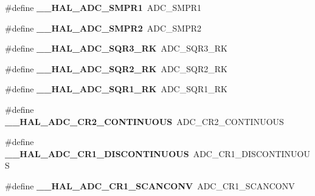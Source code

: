 \begin{DoxyCompactItemize}
\#define {\bfseries \+\_\+\+\_\+\+H\+A\+L\+\_\+\+A\+D\+C\+\_\+\+S\+M\+P\+R1}~A\+D\+C\+\_\+\+S\+M\+P\+R1
\item 
\mbox{\label{group___h_a_l___a_d_c___aliased___macros_gabd50880ede02b19440d1dbc549b19e8f}} 
\#define {\bfseries \+\_\+\+\_\+\+H\+A\+L\+\_\+\+A\+D\+C\+\_\+\+S\+M\+P\+R2}~A\+D\+C\+\_\+\+S\+M\+P\+R2
\item 
\mbox{\label{group___h_a_l___a_d_c___aliased___macros_ga999c539ac6b3b5ab766461e70dadf0a2}} 
\#define {\bfseries \+\_\+\+\_\+\+H\+A\+L\+\_\+\+A\+D\+C\+\_\+\+S\+Q\+R3\+\_\+\+RK}~A\+D\+C\+\_\+\+S\+Q\+R3\+\_\+\+RK
\item 
\mbox{\label{group___h_a_l___a_d_c___aliased___macros_ga6821ae59c39afefd2644d278974b2ab6}} 
\#define {\bfseries \+\_\+\+\_\+\+H\+A\+L\+\_\+\+A\+D\+C\+\_\+\+S\+Q\+R2\+\_\+\+RK}~A\+D\+C\+\_\+\+S\+Q\+R2\+\_\+\+RK
\item 
\mbox{\label{group___h_a_l___a_d_c___aliased___macros_ga907ae83ff38403071ff564a44d5ad3cb}} 
\#define {\bfseries \+\_\+\+\_\+\+H\+A\+L\+\_\+\+A\+D\+C\+\_\+\+S\+Q\+R1\+\_\+\+RK}~A\+D\+C\+\_\+\+S\+Q\+R1\+\_\+\+RK
\item 
\mbox{\label{group___h_a_l___a_d_c___aliased___macros_ga8b8d36727b15f9d630f633e453c8dc59}} 
\#define {\bfseries \+\_\+\+\_\+\+H\+A\+L\+\_\+\+A\+D\+C\+\_\+\+C\+R2\+\_\+\+C\+O\+N\+T\+I\+N\+U\+O\+US}~A\+D\+C\+\_\+\+C\+R2\+\_\+\+C\+O\+N\+T\+I\+N\+U\+O\+US
\item 
\mbox{\label{group___h_a_l___a_d_c___aliased___macros_ga0906f1443571a5dc173f0a1561f514f4}} 
\#define {\bfseries \+\_\+\+\_\+\+H\+A\+L\+\_\+\+A\+D\+C\+\_\+\+C\+R1\+\_\+\+D\+I\+S\+C\+O\+N\+T\+I\+N\+U\+O\+US}~A\+D\+C\+\_\+\+C\+R1\+\_\+\+D\+I\+S\+C\+O\+N\+T\+I\+N\+U\+O\+US
\item 
\mbox{\label{group___h_a_l___a_d_c___aliased___macros_ga92d473f3afb5552b6e4a710410fcb2f1}} 
\#define {\bfseries \+\_\+\+\_\+\+H\+A\+L\+\_\+\+A\+D\+C\+\_\+\+C\+R1\+\_\+\+S\+C\+A\+N\+C\+O\+NV}~A\+D\+C\+\_\+\+C\+R1\+\_\+\+S\+C\+A\+N\+C\+O\+NV

\end{DoxyCompactItemize}
